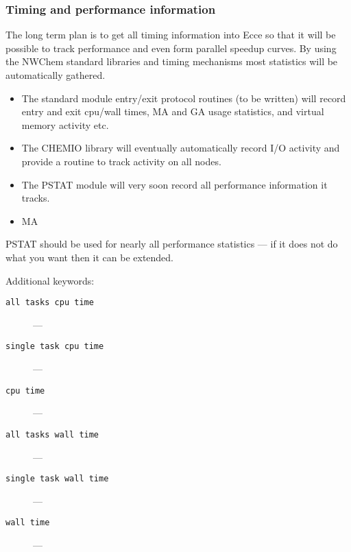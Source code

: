 \subsubsection{Timing and performance information}

The long term plan is to get all timing information into Ecce so that
it will be possible to track performance and even form parallel
speedup curves.  By using the NWChem standard libraries and timing
mechanisms most statistics will be automatically gathered.

\begin{itemize}
\item The standard module entry/exit protocol routines (to be written)
  will record entry and exit cpu/wall times, MA and GA usage
  statistics, and virtual memory activity etc.
\item The CHEMIO library will eventually automatically record I/O
  activity and provide a routine to track activity on all nodes.
\item The PSTAT module will very soon record all performance
  information it tracks.
\item MA 
\end{itemize}

PSTAT should be used for nearly all performance statistics --- if it
does not do what you want then it can be extended.

Additional keywords:
\begin{description}
\item [\texttt{all tasks cpu time}] ---
\item [\texttt{single task cpu time}] ---
\item [\texttt{cpu time}] ---
\item [\texttt{all tasks wall time}] ---
\item [\texttt{single task wall time}] ---
\item [\texttt{wall time}] ---
\end{description}

